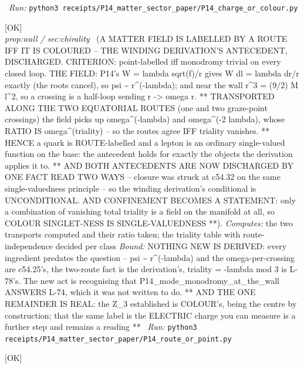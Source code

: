 \begin{description}
\ \emph{Run:} \texttt{python3 receipts/P14\_matter\_sector\_paper/P14\_charge\_or\_colour.py}
\item[\label{rcpt:P14_route_or_point}\texttt{P14\_route\_or\_point}]\hfill\textsf{[OK]}\\
\textit{prop:wall / sec:chirality} \ (A MATTER FIELD IS LABELLED BY A ROUTE IFF IT IS COLOURED -- THE WINDING DERIVATION'S ANTECEDENT, DISCHARGED. CRITERION: point-labelled iff monodromy trivial on every closed loop. THE FIELD: P14's W = lambda sqrt(f)/r gives W dl = lambda dr/r exactly (the roots cancel), so psi \textasciitilde{} r\textasciicircum{}(-lambda); and near the wall r\textasciicircum{}3 = (9/2) M l\textasciicircum{}2, so a crossing is a half-loop sending r -> omega r. ** TRANSPORTED ALONG THE TWO EQUATORIAL ROUTES (one and two graze-point crossings) the field picks up omega\textasciicircum{}(-lambda) and omega\textasciicircum{}(-2 lambda), whose RATIO IS omega\textasciicircum{}(triality) -- so the routes agree IFF triality vanishes. ** HENCE a quark is ROUTE-labelled and a lepton is an ordinary single-valued function on the base: the antecedent holds for exactly the objects the derivation applies it to. ** AND BOTH ANTECEDENTS ARE NOW DISCHARGED BY ONE FACT READ TWO WAYS -- closure was struck at c54.32 on the same single-valuedness principle -- so the winding derivation's conditional is UNCONDITIONAL. AND CONFINEMENT BECOMES A STATEMENT: only a combination of vanishing total triality is a field on the manifold at all, so COLOUR SINGLET-NESS IS SINGLE-VALUEDNESS **). 
\emph{Computes:} the two transports computed and their ratio taken; the triality table with route-independence decided per class
 \emph{Bound:} NOTHING NEW IS DERIVED: every ingredient predates the question -- psi \textasciitilde{} r\textasciicircum{}(-lambda) and the omega-per-crossing are c54.25's, the two-route fact is the derivation's, triality = -lambda mod 3 is L-78's. The new act is recognising that P14\_mode\_monodromy\_at\_the\_wall ANSWERS L-74, which it was not written to do. ** AND THE ONE REMAINDER IS REAL: the Z\_3 established is COLOUR's, being the centre by construction; that the same label is the ELECTRIC charge you can measure is a further step and remains a reading **
\ \emph{Run:} \texttt{python3 receipts/P14\_matter\_sector\_paper/P14\_route\_or\_point.py}
\item[\label{rcpt:P14_the_bundle_is_the_branching}\texttt{P14\_the\_bundle\_is\_the\_branching}]\hfill\textsf{[OK]}\\

\end{description}
